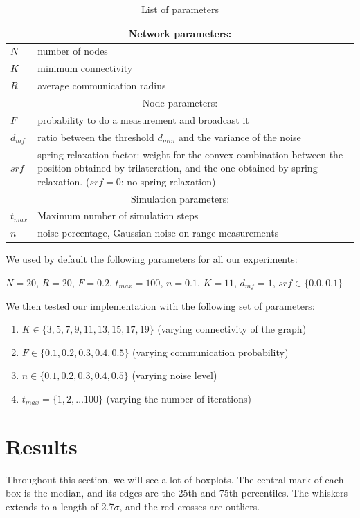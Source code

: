 \documentclass[letterpaper, 10 pt, conference]{ieeeconf}  %
\begin{document}
\begin{table}[!hbt]
\begin{tabularx}{8.4cm}{|p{1cm}|p{6.5cm}|}
\hline
\multicolumn{2}{|c|}{Network parameters:} \\
\hline
$N$ & number of nodes \\
$K$ & minimum connectivity \\
$R$ & average communication radius \\
\hline
\multicolumn{2}{|c|}{Node parameters:} \\
\hline
$F$ & probability to do a measurement and broadcast it \\
$d_{mf}$ & ratio between the threshold $d_{min}$ and the variance of the noise \\
$srf$ & spring relaxation factor: weight for the convex combination between the position obtained by trilateration, and the one obtained by spring relaxation. ($srf=0$: no spring relaxation) \\
\hline
\multicolumn{2}{|c|}{Simulation parameters:} \\
\hline
$t_{max}$ & Maximum number of simulation steps \\
$n$ & noise percentage, Gaussian noise on range measurements \\
\hline
\end{tabularx}
\caption{\label{table:parameters}List of parameters}
\end{table}

We used by default the following parameters for all our experiments: 

$N = 20$, $R = 20$, $F = 0.2$, $t_{max} = 100$, $n = 0.1$, $K = 11$, $d_{mf}=1$, $srf \in \{0.0, 0.1\}$

We then tested our implementation with the following set of parameters:

\begin{enumerate}
\item $K \in \{3, 5, 7, 9, 11, 13, 15, 17, 19\}$ (varying connectivity of the graph)
\item $F \in \{0.1, 0.2, 0.3, 0.4, 0.5\}$ (varying communication probability)
\item $n \in \{0.1, 0.2, 0.3, 0.4, 0.5\}$ (varying noise level)
\item $t_{max} = \{1, 2, \ldots 100\}$ (varying the number of iterations)
\end{enumerate}

\section{Results}
Throughout this section, we will see a lot of boxplots. The central mark of each box is the median, and its edges are the 25th and 75th percentiles. The whiskers extends to a length of 2.7$\sigma$, and the red crosses are outliers.
\end{document}
